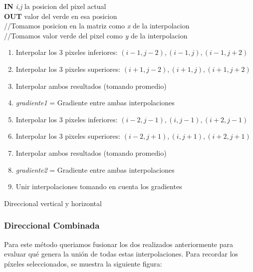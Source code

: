 \documentclass[10pt, a4paper]{article}
\begin{document}
\vspace{0.5cm}
\begin{algorithm}[H]
\textbf{IN} \textit{i,j} la posicion del pixel actual \\
\textbf{OUT} valor del verde en esa posicion\\
//Tomamos posicion en la matriz  como \textit{x} de la interpolacion\\
//Tomamos valor verde del pixel como \textit{y} de la interpolacion\\
\begin{enumerate}[label=\bfseries Step \arabic*:]
\item Interpolar los 3 pixeles inferiores: $(i-1,j-2),(i-1,j),(i-1,j+2)$\\
\item Interpolar los 3 pixeles superiores: $(i+1,j-2),(i+1,j),(i+1,j+2)$\\
\item Interpolar ambos resultados (tomando promedio)\\
\item \textit{gradiente1} = Gradiente entre ambas interpolaciones\\
\item Interpolar los 3 pixeles inferiores: $(i-2, j-1),(i, j-1), (i+2, j-1)$
\item Interpolar los 3 pixeles superiores: $(i-2, j+1),(i, j+1), (i+2, j+1)$
\item Interpolar ambos resultados (tomando promedio)\\
\item \textit{gradiente2} = Gradiente entre ambas interpolaciones\\
\item Unir interpolaciones tomando en cuenta los gradientes\\
\end{enumerate}
\caption{Direccional vertical y horizontal}
\end{algorithm}
\vspace{0.5cm}

\subsubsection{Direccional Combinada}

Para este m\'etodo queriamos fusionar los dos realizados anteriormente para evaluar qu\'e genera la uni\'on de todas estas interpolaciones. Para recordar los p\'ixeles seleccionados, se muestra la siguiente figura:
\end{document}
